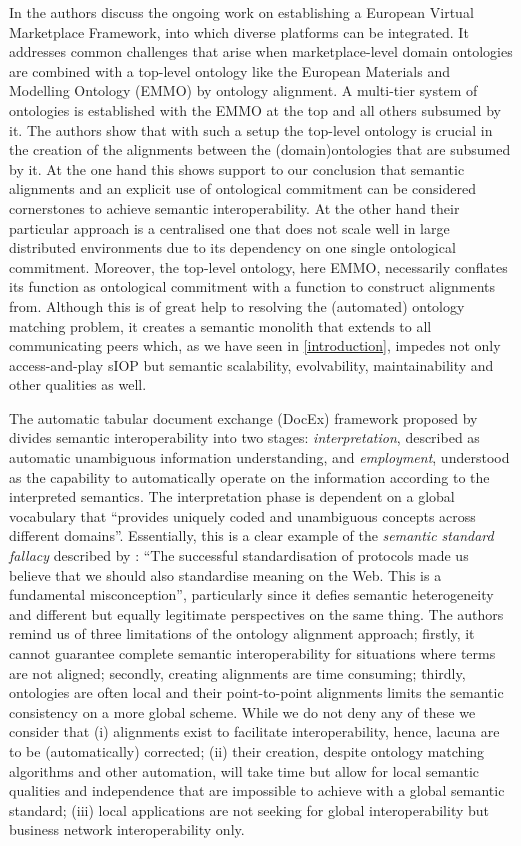 \documentclass[sort&compress,preprint,authoryear,3p,twocolumn]{elsarticle}
\begin{document}
In \citep{Horsch2020} the authors discuss the ongoing work on
establishing a European Virtual Marketplace Framework, into which
diverse platforms can be integrated. It addresses common challenges that
arise when marketplace-level domain ontologies are combined with a
top-level ontology like the European Materials and Modelling Ontology
(EMMO) by ontology alignment. A multi-tier system of ontologies is
established with the EMMO at the top and all others subsumed by it. The
authors show that with such a setup the top-level ontology is crucial in
the creation of the alignments between the (domain)ontologies that are
subsumed by it. At the one hand this shows support to our conclusion
that semantic alignments and an explicit use of ontological commitment
can be considered cornerstones to achieve semantic interoperability. At
the other hand their particular approach is a centralised one that does
not scale well in large distributed environments due to its dependency
on one single ontological commitment. Moreover, the top-level ontology,
here EMMO, necessarily conflates its function as ontological commitment
with a function to construct alignments from. Although this is of great
help to resolving the (automated) ontology matching problem, it creates
a semantic monolith that extends to all communicating peers which, as we
have seen in \cref{introduction}, impedes not only access-and-play sIOP
but semantic scalability, evolvability, maintainability and other
qualities as well.

The automatic tabular document exchange (DocEx) framework proposed by
\cite{Yang2017} divides semantic interoperability into two stages:
\emph{interpretation}, described as automatic unambiguous information
understanding, and \emph{employment}, understood as the capability to
automatically operate on the information according to the interpreted
semantics. The interpretation phase is dependent on a global vocabulary
that ``provides uniquely coded and unambiguous concepts across different
domains''. Essentially, this is a clear example of the \emph{semantic
standard fallacy} described by \cite{Janowicz:2013ui}: ``The successful
standardisation of protocols made us believe that we should also
standardise meaning on the Web. This is a fundamental misconception'',
particularly since it defies semantic heterogeneity and different but
equally legitimate perspectives on the same thing. The authors remind us
of three limitations of the ontology alignment approach; firstly, it
cannot guarantee complete semantic interoperability for situations where
terms are not aligned; secondly, creating alignments are time consuming;
thirdly, ontologies are often local and their point-to-point alignments
limits the semantic consistency on a more global scheme. While we do not
deny any of these we consider that (i) alignments exist to facilitate
interoperability, hence, lacuna are to be (automatically) corrected;
(ii) their creation, despite ontology matching algorithms and other
automation, will take time but allow for local semantic qualities and
independence that are impossible to achieve with a global semantic
standard; (iii) local applications are not seeking for global
interoperability but business network interoperability only.
\end{document}
